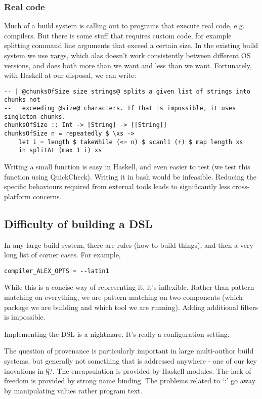 \subsubsection{Real code}

Much of a build system is calling out to programs that execute real code, e.g. compilers. But there is some stuff that requires custom code, for example splitting command line arguments that exceed a certain size. In the existing build system we use xargs, which alas doesn't work consistently between different OS versions, and does both more than we want and less than we want. Fortunately, with Haskell at our disposal, we can write:

\begin{lstlisting}
-- | @chunksOfSize size strings@ splits a given list of strings into chunks not
--   exceeding @size@ characters. If that is impossible, it uses singleton chunks.
chunksOfSize :: Int -> [String] -> [[String]]
chunksOfSize n = repeatedly $ \xs ->
    let i = length $ takeWhile (<= n) $ scanl1 (+) $ map length xs
    in splitAt (max 1 i) xs
\end{lstlisting}

Writing a small function is easy in Haskell, and even easier to test (we test this function using QuickCheck). Writing it in bash would be infeasible. Reducing the specific behaviours required from external tools leads to significantly less cross-platform concerns.

\subsection{Difficulty of building a DSL}

In any large build system, there are rules (how to build things), and then a very long list of corner cases. For example,

\begin{lstlisting}
compiler_ALEX_OPTS = --latin1
\end{lstlisting}

While this is a concise way of representing it, it's inflexible. Rather than pattern matching on everything, we are pattern matching on two components (which package we are building and which tool we are running). Adding additional filters is impossible.

Implementing the DSL is a nightmare. It's really a configuration setting.


The question of provenance is particularly important in large multi-author build systems, but generally not something that is addressed anywhere - one of our key inovations in \S?. The encapsulation is provided by Haskell modules. The lack of freedom is provided by strong name binding. The problems related to `:' go away by manipulating values rather program text.


